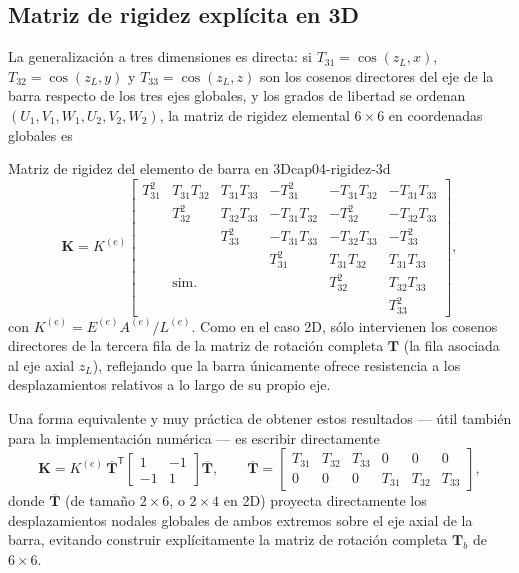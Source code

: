 \subsection{Matriz de rigidez explícita en 3D}

La generalización a tres dimensiones es directa: si $T_{31}=\cos(z_L,x)$, $T_{32}=\cos(z_L,y)$ y $T_{33}=\cos(z_L,z)$ son los cosenos directores del eje de la barra respecto de los tres ejes globales, y los grados de libertad se ordenan $(U_1,V_1,W_1,U_2,V_2,W_2)$, la matriz de rigidez elemental $6\times6$ en coordenadas globales es

\begin{ecnimportante}{Matriz de rigidez del elemento de barra en 3D}{cap04-rigidez-3d}
\[
\mathbf{K} = K^{(e)}
\begin{bmatrix}
T_{31}^2 & T_{31}T_{32} & T_{31}T_{33} & -T_{31}^2 & -T_{31}T_{32} & -T_{31}T_{33} \\
 & T_{32}^2 & T_{32}T_{33} & -T_{31}T_{32} & -T_{32}^2 & -T_{32}T_{33} \\
 & & T_{33}^2 & -T_{31}T_{33} & -T_{32}T_{33} & -T_{33}^2 \\
 & & & T_{31}^2 & T_{31}T_{32} & T_{31}T_{33} \\
 & \text{sim.} & & & T_{32}^2 & T_{32}T_{33} \\
 & & & & & T_{33}^2
\end{bmatrix},
\]
con $K^{(e)}=E^{(e)}A^{(e)}/L^{(e)}$. Como en el caso 2D, sólo intervienen los cosenos directores de la tercera fila de la matriz de rotación completa $\mathbf{T}$ (la fila asociada al eje axial $z_L$), reflejando que la barra únicamente ofrece resistencia a los desplazamientos relativos a lo largo de su propio eje.
\end{ecnimportante}

Una forma equivalente y muy práctica de obtener estos resultados --- útil también para la implementación numérica --- es escribir directamente
\[
\mathbf{K} = K^{(e)}\,\overline{\mathbf{T}}^{\mathsf T}\begin{bmatrix}1&-1\\-1&1\end{bmatrix}\overline{\mathbf{T}}, \qquad
\overline{\mathbf{T}} = \begin{bmatrix} T_{31} & T_{32} & T_{33} & 0 & 0 & 0 \\ 0 & 0 & 0 & T_{31} & T_{32} & T_{33} \end{bmatrix},
\]
donde $\overline{\mathbf{T}}$ (de tamaño $2\times6$, o $2\times4$ en 2D) proyecta directamente los desplazamientos nodales globales de ambos extremos sobre el eje axial de la barra, evitando construir explícitamente la matriz de rotación completa $\mathbf{T}_b$ de $6\times6$.

